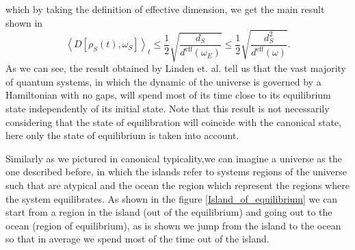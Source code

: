 which by taking the definition of effective dimension, we get the main result shown in \cite{linden_quantum_2009}
\begin{equation}
\left\langle D\left[\rho_{S}(t), \omega_{S}\right]\right\rangle_{t} \leq \frac{1}{2} \sqrt{\frac{d_{S}}{d^{\mathrm{eff}}\left(\omega_{E}\right)}} \leq \frac{1}{2} \sqrt{\frac{d_{S}^{2}}{d^{\mathrm{eff}}(\omega) }}.
\label{CH1:Result_linden}
\end{equation}
\indent As we can see, the result obtained by Linden et. al. tell us that the vast majority of quantum systems, in which the dynamic of the universe is governed by a Hamiltonian with no gaps, will spend most of its time close to its equilibrium state independently of its initial state. Note that this result is not necessarily considering that the state of equilibration will coincide with the canonical state, here only the state of equilibrium is taken into account.

\indent Similarly as we pictured in canonical typicality,we can imagine a universe as the one described before, in which the islands refer to systems regions of the universe such that are atypical and the ocean the region which represent the regions where the system equilibrates. As shown in the figure 
\ref{Island_of_equilibrium} we can start from a region in the island (out of the equilibrium) and going out to the ocean (region of equilibrium), as is shown we jump from the island to the ocean so that in average we spend most of the time out of the island.\\


